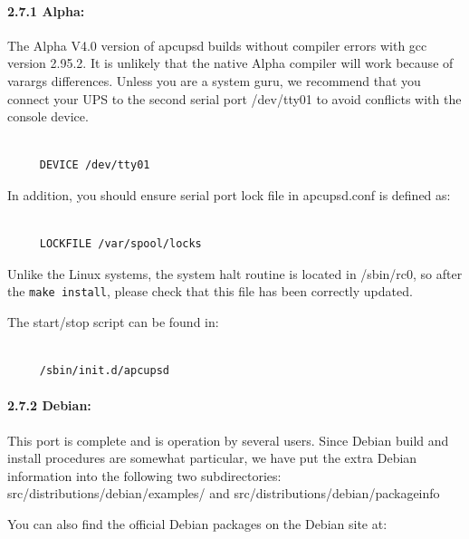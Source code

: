 \label{Alpha}

\paragraph*{2.7.1 Alpha:}

\label{index-Alpha-32}
\label{index-OS_002c-Alpha-33}
The Alpha V4.0 version of apcupsd builds without compiler errors with gcc
version 2.95.2. It is unlikely that the native Alpha compiler will work
because of varargs differences. Unless you are a system guru, we recommend
that you connect your UPS to the second serial port /dev/tty01 to avoid
conflicts with the console device. 

\footnotesize
\begin{verbatim}
     
     DEVICE /dev/tty01
\end{verbatim}
\normalsize

In addition, you should ensure serial port lock file in apcupsd.conf is
defined as: 

\footnotesize
\begin{verbatim}
     
     LOCKFILE /var/spool/locks
\end{verbatim}
\normalsize

Unlike the Linux systems, the system halt routine is located in /sbin/rc0, so
after the {\tt make install}, please check that this file has been correctly
updated.  

The start/stop script can be found in: 

\footnotesize
\begin{verbatim}
     
     /sbin/init.d/apcupsd
\end{verbatim}
\normalsize

\label{Debian}

\paragraph*{2.7.2 Debian:}

\label{index-Debian-34}
\label{index-OS_002c-Debian-35}
This port is complete and is operation by several users. Since Debian build
and install procedures are somewhat particular, we have put the extra Debian
information into the following two subdirectories:
\lt{}src\gt{}/distributions/debian/examples/ and
\lt{}src\gt{}/distributions/debian/packageinfo  

You can also find the official Debian packages on the Debian site at:  

